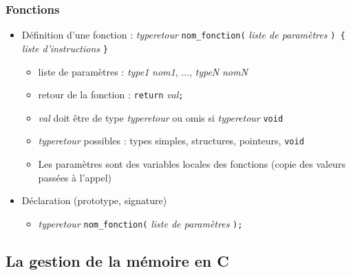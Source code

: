 \begin{frame}[fragile]
\frametitle{Fonctions}
\begin{itemize}
\item Définition d'une fonction : \textit{typeretour} \verb|nom_fonction(| \textit{liste de paramètres} \verb|) {|  \textit{liste d'instructions }\verb|}|
\begin{itemize}
\item liste de paramètres : \textit{type1} \textit{nom1}, ..., \textit{typeN} \textit{nomN}
\item retour de la fonction : \verb|return| \textit{val}\verb|;|
\item \textit{val} doit être de type \textit{typeretour} ou omis si \textit{typeretour} \verb|void|
\item \textit{typeretour} possibles : types simples, structures, pointeurs, \verb|void|
\item Les paramètres sont des variables locales des fonctions (copie des valeurs passées à l'appel)
\end{itemize}
\item Déclaration (prototype, signature)
\begin{itemize}
\item \textit{typeretour} \verb|nom_fonction(| \textit{liste de paramètres} \verb|);|
\end{itemize}
\end{itemize}
\end{frame}

\subsection{La gestion de la mémoire en C}


